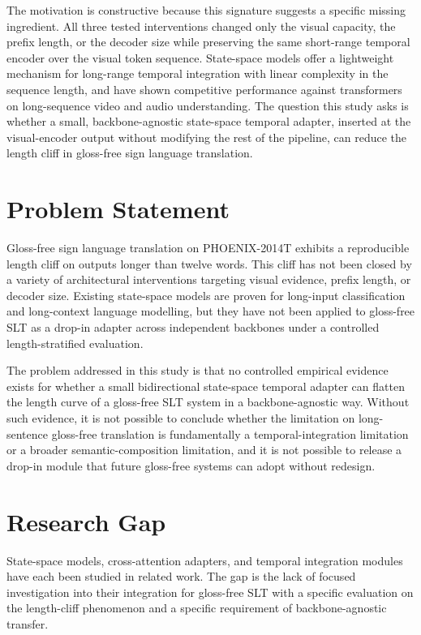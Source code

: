 The motivation is constructive because this signature suggests a specific missing ingredient. All three tested interventions changed only the visual capacity, the prefix length, or the decoder size while preserving the same short-range temporal encoder over the visual token sequence. State-space models offer a lightweight mechanism for long-range temporal integration with linear complexity in the sequence length, and \citet{gu2022s4,gu2023mamba} have shown competitive performance against transformers on long-sequence video and audio understanding. The question this study asks is whether a small, backbone-agnostic state-space temporal adapter, inserted at the visual-encoder output without modifying the rest of the pipeline, can reduce the length cliff in gloss-free sign language translation.

\section{Problem Statement}

Gloss-free sign language translation on PHOENIX-2014T exhibits a reproducible length cliff on outputs longer than twelve words. This cliff has not been closed by a variety of architectural interventions targeting visual evidence, prefix length, or decoder size. Existing state-space models are proven for long-input classification and long-context language modelling, but they have not been applied to gloss-free SLT as a drop-in adapter across independent backbones under a controlled length-stratified evaluation.

The problem addressed in this study is that no controlled empirical evidence exists for whether a small bidirectional state-space temporal adapter can flatten the length curve of a gloss-free SLT system in a backbone-agnostic way. Without such evidence, it is not possible to conclude whether the limitation on long-sentence gloss-free translation is fundamentally a temporal-integration limitation or a broader semantic-composition limitation, and it is not possible to release a drop-in module that future gloss-free systems can adopt without redesign.

\section{Research Gap}

State-space models, cross-attention adapters, and temporal integration modules have each been studied in related work. The gap is the lack of focused investigation into their integration for gloss-free SLT with a specific evaluation on the length-cliff phenomenon and a specific requirement of backbone-agnostic transfer.

